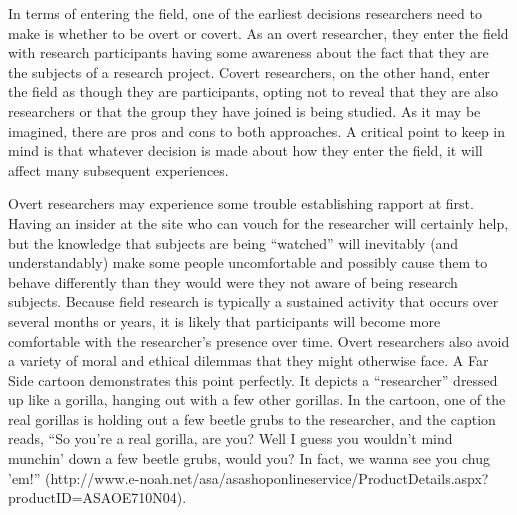 In terms of entering the field, one of the earliest decisions researchers need to make is whether to be overt or covert. As an overt researcher, they enter the field with research participants having some awareness about the fact that they are the subjects of a research project. Covert researchers, on the other hand, enter the field as though they are participants, opting not to reveal that they are also researchers or that the group they have joined is being studied. As it may be imagined, there are pros and cons to both approaches. A critical point to keep in mind is that whatever decision is made about how they enter the field, it will affect many subsequent experiences.

Overt researchers may experience some trouble establishing rapport at first. Having an insider at the site who can vouch for the researcher will certainly help, but the knowledge that subjects are being ``watched'' will inevitably (and understandably) make some people uncomfortable and possibly cause them to behave differently than they would were they not aware of being research subjects. Because field research is typically a sustained activity that occurs over several months or years, it is likely that participants will become more comfortable with the researcher's presence over time. Overt researchers also avoid a variety of moral and ethical dilemmas that they might otherwise face. A Far Side cartoon demonstrates this point perfectly. It depicts a ``researcher'' dressed up like a gorilla, hanging out with a few other gorillas. In the cartoon, one of the real gorillas is holding out a few beetle grubs to the researcher, and the caption reads, ``So you’re a real gorilla, are you? Well I guess you wouldn’t mind munchin’ down a few beetle grubs, would you? In fact, we wanna see you chug ’em!'' (http://www.e-noah.net/asa/asashoponlineservice/ProductDetails.aspx?productID=ASAOE710N04).

